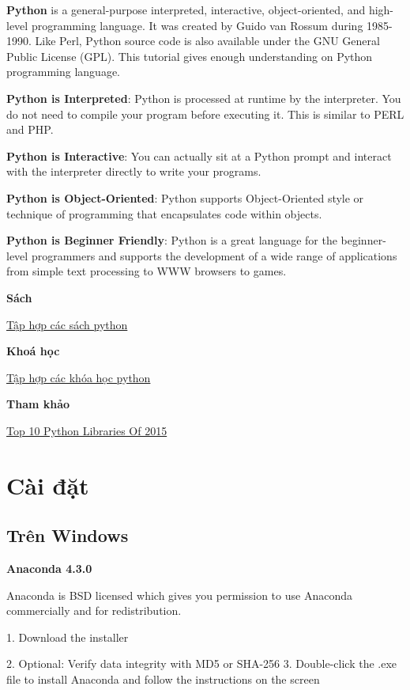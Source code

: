 \textbf{Python} is a general-purpose interpreted, interactive, object-oriented, and high-level programming language. It was created by Guido van Rossum during 1985- 1990. Like Perl, Python source code is also available under the GNU General Public License (GPL). This tutorial gives enough understanding on Python programming language.

\textbf{Python is Interpreted}: Python is processed at runtime by the interpreter. You do not need to compile your program before executing it. This is similar to PERL and PHP.

\textbf{Python is Interactive}: You can actually sit at a Python prompt and interact with the interpreter directly to write your programs.

\textbf{Python is Object-Oriented}: Python supports Object-Oriented style or technique of programming that encapsulates code within objects.

\textbf{Python is Beginner Friendly}: Python is a great language for the beginner-level programmers and supports the development of a wide range of applications from simple text processing to WWW browsers to games.

\textbf{Sách}

\href{https://docs.google.com/document/d/1gQFMXZtynpuTenoOQNGCHttArT4NspTWcyJQr5ps9Mk/edit?usp=sharing}{Tập hợp các sách python}

\textbf{Khoá học}

\href{1frO9QYhgsXbMzcyXoA4czWkxTWF8RBTJVf9uoO1rElU}{Tập hợp các khóa học python}

\textbf{Tham khảo}

\href{http://blog.tryolabs.com/2015/12/15/top-10-python-libraries-of-2015/}{Top 10 Python Libraries Of 2015}

\section{Cài đặt}

\subsection{Trên Windows}

\textbf{Anaconda 4.3.0}

Anaconda is BSD licensed which gives you permission to use Anaconda commercially and for redistribution.

1. Download the installer

2. Optional: Verify data integrity with MD5 or SHA-256
3. Double-click the .exe file to install Anaconda and follow the instructions on the screen

